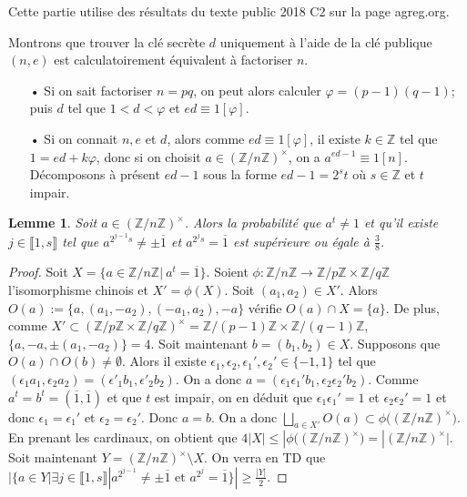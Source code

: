 \documentclass[12pt]{report}
\newtheorem{lemme}[thm]{Lemme}
\newcommand{\Z}{\mathbb{Z}}
\begin{document}
Cette partie utilise des résultats du texte public 2018 C2 sur la page agreg.org.

Montrons que trouver la clé secrète $d$ uniquement à l'aide de la clé publique $(n,e)$ est calculatoirement équivalent à factoriser $n$.

\begin{itemize}
\item[•] Si on sait factoriser $n=pq$, on peut alors calculer $\varphi=(p-1)(q-1)$; puis $d$ tel que $1<d<\varphi$ et $ed \equiv 1 [\varphi]$.
\item[•] Si on connait $n,e$ et $d$, alors comme $ed \equiv 1 [\varphi]$, il existe $k \in \mathbb{Z}$ tel que $1=ed + k \varphi$, donc si on choisit $a \in (\mathbb{Z}/n\mathbb{Z})^{\times}  $, on a $a^{ed-1}\equiv 1 [n]$. Décomposons à présent $ed-1$ sous la forme $ed-1=2^s t$ où $s \in \mathbb{Z}$ et $t$ impair.\\



\end{itemize}


\begin{lemme}\label{lemProba}
Soit $a\in (\Z/n\Z)^\times$. Alors la probabilité que $a^t\neq 1$ et qu'il existe $j\in \llbracket 1,s\rrbracket$ tel que $a^{2^{j-1}s}\neq \pm\overline{1}$ et $a^{2^js}=\overline{1}$ est supérieure ou égale à $\frac{3}{8}$.
\end{lemme}


\begin{proof}
Soit $X=\{a\in \Z/n\Z|\ a^t=\overline{1}\}$. Soient $\phi:\Z/n\Z\rightarrow \Z/p\Z\times \Z/q\Z$ l'isomorphisme chinois et $X'=\phi(X)$. Soit $(a_1,a_2)\in X'$. Alors $O(a):=\{a,(a_1,-a_2),(-a_1,a_2),-a\}$ vérifie $O(a)\cap X=\{a\}$. De plus, comme $X'\subset (\Z/p\Z\times \Z/q\Z)^\times =\Z/(p-1)\Z\times \Z/(q-1)\Z$, $\{a,-a,\pm(a_1,-a_2)\}=4$. Soit maintenant $b=(b_1,b_2)\in X$. Supposons que $O(a)\cap O(b)\neq \emptyset$. Alors il existe $\epsilon_1,\epsilon_2,\epsilon_1',\epsilon_2'\in \{-1,1\}$ tel que $(\epsilon_1a_1,\epsilon_2 a_2)=(\epsilon'_1 b_1,\epsilon'_2 b_2)$.  On a donc $a=(\epsilon_1\epsilon_1' b_1,\epsilon_2\epsilon_2' b_2)$. Comme $a^t=b^t=(\overline{1},\overline{1})$ et que $t$ est impair, on en déduit que $\epsilon_1\epsilon_1'=1$ et $\epsilon_2\epsilon_2'=1$ et donc $\epsilon_1=\epsilon_1'$ et $\epsilon_2=\epsilon_2'$. Donc $a=b$. On a donc $\bigsqcup_{a\in X'}O(a)\subset \phi\big((\Z/n\Z)^\times\big)$. En prenant les cardinaux, on obtient que $4|X|\leq |\phi\big((\Z/n\Z)^\times\big)=|(\Z/n\Z)^\times|$. Soit maintenant $Y=(\Z/n\Z)^\times \setminus X$. On verra en TD que $|\{a\in Y|\exists j\in \llbracket 1,s\rrbracket|a^{2^{j-1}}\neq \pm\overline{1}\text{ et }a^{2^j}=\overline{1}\}|\geq \frac{|Y|}{2}$. 
\end{proof}
\end{document}

